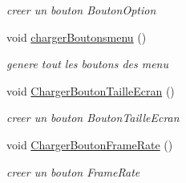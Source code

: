 \begin{DoxyCompactItemize}
\begin{DoxyCompactList}\small\item\em creer un bouton Bouton\+Option \end{DoxyCompactList}\item 
void \mbox{\hyperlink{classmenu_acf8e92d81eea07dc6b5dc023469a90ff}{charger\+Boutonsmenu}} ()
\begin{DoxyCompactList}\small\item\em genere tout les boutons des menu \end{DoxyCompactList}\item 
void \mbox{\hyperlink{classmenu_a97deef80922bf2c9959a495f236516a1}{Charger\+Bouton\+Taille\+Ecran}} ()
\begin{DoxyCompactList}\small\item\em creer un bouton Bouton\+Taille\+Ecran \end{DoxyCompactList}\item 
void \mbox{\hyperlink{classmenu_ad6efc2e7479c9214b699b29f9ed82815}{Charger\+Bouton\+Frame\+Rate}} ()
\begin{DoxyCompactList}\small\item\em creer un bouton Frame\+Rate \end{DoxyCompactList}\end{DoxyCompactItemize}
